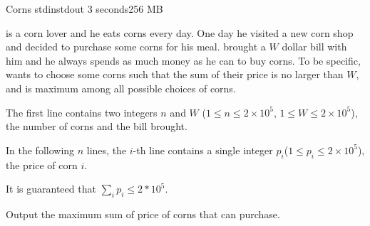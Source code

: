 \begin{problem}{Corns}
{stdin}{stdout}
{3 seconds}{256 MB}{}

\pittoresque is a corn lover and he eats corns every day. One day he visited a new corn shop and decided to purchase some corns for his meal. \pittoresque brought a $W$ dollar bill with him and he always spends as much money as he can to buy corns. To be specific, \pittoresque wants to choose some corns such that the sum of their price is no larger than $W$, and is maximum among all possible choices of corns.


\InputFile

The first line contains two integers $n$ and $W$ ($1 \le n \le 2 \times 10^5$, $1 \le W \le 2 \times 10^5$), the number of corns and the bill \pittoresque brought.

In the following $n$ lines, the $i$-th line contains a single integer $p_i$($1 \le p_i \le 2 \times 10^5$), the price of corn $i$.

It is guaranteed that $\sum_i p_i \leq 2 * 10^5$.

\OutputFile

Output the maximum sum of price of corns that \pittoresque can purchase.

\Examples

\begin{example}
%
\end{example}

\begin{example}
%
\end{example}



\end{problem}
